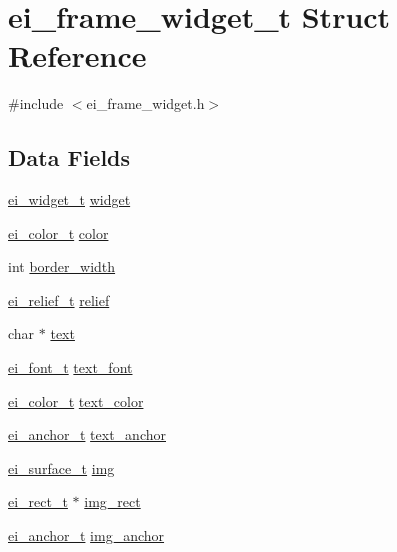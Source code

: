 \hypertarget{structei__frame__widget__t}{\section{ei\-\_\-frame\-\_\-widget\-\_\-t Struct Reference}
\label{structei__frame__widget__t}
}


{\ttfamily \#include $<$ei\-\_\-frame\-\_\-widget.\-h$>$}

\subsection*{Data Fields}
\begin{DoxyCompactItemize}
\item 
\hyperlink{structei__widget__t}{ei\-\_\-widget\-\_\-t} \hyperlink{structei__frame__widget__t_a89903d2fb772642f95987d3faf1494e0}{widget}
\item 
\hyperlink{structei__color__t}{ei\-\_\-color\-\_\-t} \hyperlink{structei__frame__widget__t_ad5655f5b5eca009feaa3e1cbe3c0e761}{color}
\item 
int \hyperlink{structei__frame__widget__t_a3c9f48c109681702db85b9e02a60cd1a}{border\-\_\-width}
\item 
\hyperlink{ei__types_8h_aa79a32b1d8ece0e44cfa394e870b270b}{ei\-\_\-relief\-\_\-t} \hyperlink{structei__frame__widget__t_a23ba21889e590728603484c0e4728c8e}{relief}
\item 
char $\ast$ \hyperlink{structei__frame__widget__t_affbafa0c71029ba42c4173d665593ccd}{text}
\item 
\hyperlink{ei__types_8h_a22c8198e4d641e4bc67bb17f9c6bcda7}{ei\-\_\-font\-\_\-t} \hyperlink{structei__frame__widget__t_a3832154ce5fe1aec4eb4bc372a05158a}{text\-\_\-font}
\item 
\hyperlink{structei__color__t}{ei\-\_\-color\-\_\-t} \hyperlink{structei__frame__widget__t_aecc7c627bf739528388dd0b97fd4ec6c}{text\-\_\-color}
\item 
\hyperlink{ei__types_8h_a3852c963af609d31d7cfcff79c4c8450}{ei\-\_\-anchor\-\_\-t} \hyperlink{structei__frame__widget__t_a47ce58b9e3c67b6567a9b7739e217111}{text\-\_\-anchor}
\item 
\hyperlink{hw__interface_8h_ad9970ae727c438faaf09c58c5defb796}{ei\-\_\-surface\-\_\-t} \hyperlink{structei__frame__widget__t_abd19824f244fc5a498cd9e7df6343a91}{img}
\item 
\hyperlink{structei__rect__t}{ei\-\_\-rect\-\_\-t} $\ast$ \hyperlink{structei__frame__widget__t_a0e3772cc22eb4339b9a1c12b0cbd6667}{img\-\_\-rect}
\item 
\hyperlink{ei__types_8h_a3852c963af609d31d7cfcff79c4c8450}{ei\-\_\-anchor\-\_\-t} \hyperlink{structei__frame__widget__t_aaaf211e8637c20e80723009615f625a9}{img\-\_\-anchor}
\end{DoxyCompactItemize}


